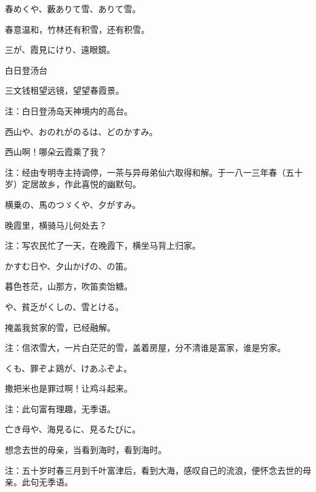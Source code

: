 \begin{haiku}
    {\FH 春めくや、藪ありて雪、ありて雪。}

    {\FK 春意温和，竹林还有积雪，还有积雪。}
\end{haiku}

\begin{haiku}
    {\FH 三が、霞見にけり、遠眼鏡。}

    {\FK 白日登汤台}

    {\FK 三文钱租望远镜，望望春霞景。}

    {\FT 注：白日登汤岛天神境内的高台。}
\end{haiku}

\begin{haiku}
    {\FH 西山や、おのれがのるは、どのかすみ。}

    {\FK 西山啊！哪朵云霞乘了我？}

    {\FT 注：经由专明寺主持调停，一茶与异母弟仙六取得和解。于一八一三年春（五十岁）定居故乡，作此喜悦的幽默句。}
\end{haiku}

\begin{haiku}
    {\FH 横乗の、馬のつゞくや、夕がすみ。}

    {\FK 晚霞里，横骑马儿何处去？}

    {\FT 注：写农民忙了一天，在晚霞下，横坐马背上归家。}
\end{haiku}

\begin{haiku}
    {\FH かすむ日や、夕山かげの、の笛。}

    {\FK 暮色苍茫，山那方，吹笛卖饴糖。}
\end{haiku}

\begin{haiku}
    {\FH {}や、貧乏がくしの、雪とける。}

    {\FK 掩盖我贫家的雪，已经融解。}

    {\FT 注：信浓雪大，一片白茫茫的雪，盖着房屋，分不清谁是富家，谁是穷家。}
\end{haiku}

\begin{haiku}
    {\FH {}くも、罪ぞよ鶏が、けあふぞよ。}

    {\FK 撒把米也是罪过啊！让鸡斗起来。}

    {\FT 注：此句富有理趣，无季语。}
\end{haiku}

\begin{haiku}
    {\FH 亡き母や、海見るに、見るたびに。}

    {\FK 想念去世的母亲，当看到海时，看到海时。}

    {\FT 注：五十岁时春三月到千叶富津后，看到大海，感叹自己的流浪，便怀念去世的母亲。此句无季语。}
\end{haiku}

